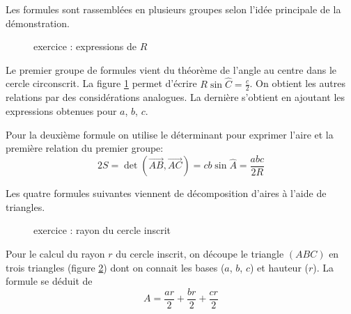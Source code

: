 Les formules sont rassemblées en plusieurs groupes selon l'idée principale de la démonstration.\\
\begin{figure}[h!t]
 \centering
 
 \caption{exercice  : expressions de $R$}
 \label{fig:Cgp10_1}
\end{figure}

Le premier groupe de formules vient du théorème de l'angle au centre dans le cercle circonscrit. La figure \ref{fig:Cgp10_1} permet d'écrire $R\sin \widehat C = \frac{c}{2}$. On obtient les autres relations par des considérations analogues. La dernière s'obtient en ajoutant les expressions obtenues pour $a$, $b$, $c$.

Pour la deuxième formule on utilise le déterminant pour exprimer l'aire et la première relation du premier groupe: 
\begin{displaymath}
 2S = \det(\overrightarrow{AB},\overrightarrow{AC}) = cb\sin \widehat A = \frac{abc}{2R}
\end{displaymath}

Les quatre formules suivantes viennent de décomposition d'aires à l'aide de triangles.
\begin{figure}[h!t]
 \centering
 
 \caption{exercice  : rayon du cercle inscrit}
 \label{fig:Cgp10_2}
\end{figure}
Pour le calcul du rayon $r$ du cercle inscrit, on découpe le triangle $(ABC)$ en trois triangles (figure \ref{fig:Cgp10_2}) dont on connait les bases ($a$, $b$, $c$) et hauteur ($r$). La formule se déduit de
\begin{displaymath}
 A = \frac{ar}{2}+\frac{br}{2}+\frac{cr}{2} 
\end{displaymath}

